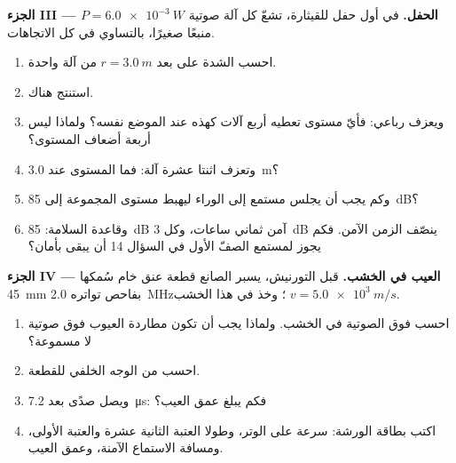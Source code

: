 \begin{problem}
\medskip
\noindent\textbf{الجزء III --- الحفل.}
في أول حفل للقيثارة، تشعّ كل آلة 
صوتية $P = \qty{6.0e-3}{W}$ منبعًا صغيرًا، بالتساوي في كل
الاتجاهات.
\begin{enumerate}[resume]
  \item احسب الشدة على بعد $r = \qty{3.0}{m}$ من آلة واحدة.
  \item استنتج  هناك.
  \item ويعزف رباعي: فأيّ مستوى تعطيه أربع آلات كهذه
        عند الموضع نفسه؟ ولماذا ليس أربعة أضعاف المستوى؟
  \item وتعزف اثنتا عشرة آلة: فما المستوى عند \qty{3.0}{m}؟
  \item وكم يجب أن يجلس مستمع إلى الوراء ليهبط مستوى المجموعة
        إلى \qty{85}{dB}؟
  \item وقاعدة السلامة: \qty{85}{dB} آمن ثماني ساعات، وكل
        \qty{+3}{dB} ينصّف الزمن الآمن. فكم يجوز لمستمع
        الصفّ الأول في السؤال 14 أن يبقى بأمان؟
\end{enumerate}

\medskip
\noindent\textbf{الجزء IV --- العيب في الخشب.}
قبل التورنيش، يسبر الصانع قطعة عنق خام سُمكها \qty{45}{mm}
بفاحص تواتره \qty{2.0}{MHz}؛ وخذ في هذا الخشب $v = \qty{5.0e3}{m/s}$.
\begin{enumerate}[resume]
  \item احسب  فوق الصوتية في الخشب. ولماذا يجب أن تكون
         مطاردة العيوب فوق صوتية لا مسموعة؟
  \item احسب   من الوجه الخلفي للقطعة.
  \item ويصل صدًى بعد \qty{7.2}{\micro s}: فكم يبلغ عمق العيب؟
  \item اكتب بطاقة الورشة: سرعة  على الوتر، وطولا العتبة
        الثانية عشرة والعتبة الأولى، ومسافة الاستماع الآمنة، وعمق العيب.
\end{enumerate}
\end{problem}
